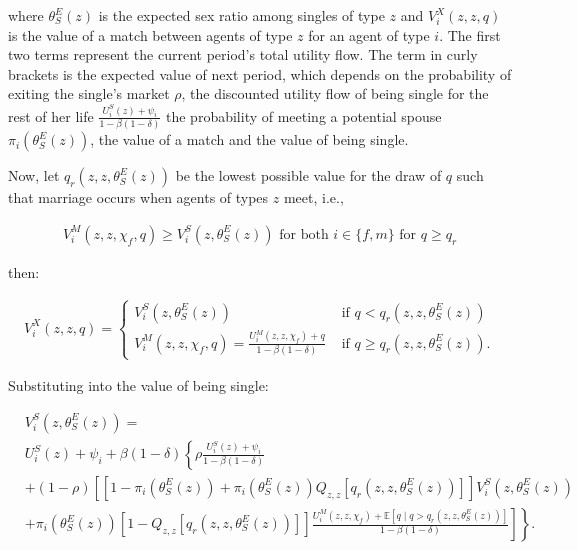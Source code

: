 \documentclass[12pt]{article}
\begin{document}
where $\theta_{S}^E(z)$ is the expected sex ratio among singles of type $z$ and $V_i^X\left(z,z,q\right)$ is the value of a match between agents of type $z$ for an agent of type $i$. The first two terms represent the current period's total utility flow. The term in curly brackets is the expected value of next period, which depends on the probability of exiting the single's market $\rho$, the discounted utility flow of being single for the rest of her life $\frac{U_i^S\left(z\right)+\psi_i}{1-\beta\left(1-\delta\right)}$ the probability of meeting a potential spouse $\pi_{i}(\theta_{S}^E(z))$, the value of a match and the value of being single.

Now, let $q_r\left(z,z,\theta_{S}^E(z)\right)$ be the lowest possible value for the draw of $q$ such that marriage occurs when agents of types $z$ meet, i.e.,

\begin{align*}
V_i^M\left(z,z,\chi_f,q\right)\geq V_i^S\left(z,\theta_{S}^E(z)\right) \text{ for both } i\in\{f,m\} \text{ for } q\geq q_r
\end{align*}

then:

\begin{align*}
V_i^X\left(z,z,q\right) = \begin{cases} 
V_i^S\left(z,\theta_{S}^E(z)\right) & \text{ if } q< q_r\left(z,z,\theta_{S}^E(z)\right) \\
V_i^M\left(z,z,\chi_f,q\right) = \frac{U_i^M(z,z,\chi_f)+q}{1-\beta\left(1-\delta\right)} & \text{ if } q\geq q_r\left(z,z,\theta_{S}^E(z)\right).
\end{cases}
\end{align*}

Substituting into the value of being single:

\begin{align}\label{eq:val_single}
	& V_i^S\left(z,\theta_{S}^E(z)\right) = \nonumber \\ & U_i^S\left(z\right)+\psi_i +\beta\left(1-\delta\right)\left\lbrace \rho \frac{U_i^S\left(z\right)+\psi_i}{1-\beta\left(1-\delta\right)} \right. \nonumber \\ 
	& \left. + \left(1-\rho\right)\left[ \left[1-\pi_{i}\left(\theta_{S}^E(z)\right)+\pi_{i}\left(\theta_{S}^E(z)\right)Q_{z,z}\left[q_r\left(z,z,\theta_{S}^E(z)\right)\right]\right]V_i^S\left(z,\theta_{S}^E(z)\right) \right. \right. \nonumber \\ & \left. \left. + \pi_{i}\left(\theta_{S}^E(z)\right)\left[1-Q_{z,z}\left[q_r\left(z,z,\theta_{S}^E(z)\right)\right]\right]\frac{U_i^M(z,z,\chi_f)+\mathbb{E}\left[q\mid q>q_r\left(z,z,\theta_{S}^E(z)\right)\right]}{1-\beta\left(1-\delta\right)} \right] \right\rbrace. 
\end{align}
\end{document}
